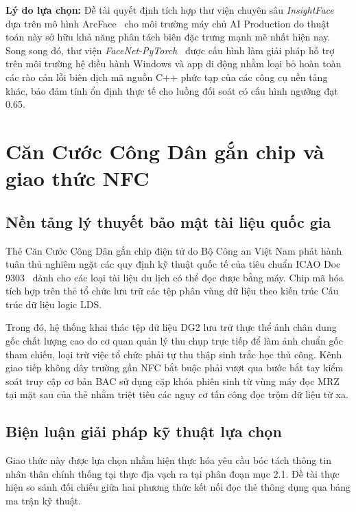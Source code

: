 ﻿\documentclass[../DoAn.tex]{subfiles}
\begin{document}
\textbf{Lý do lựa chọn:} Đề tài quyết định tích hợp thư viện chuyên sâu \textit{InsightFace}~\cite{insightface_github} dựa trên mô hình ArcFace~\cite{deng2019arcface} cho môi trường máy chủ AI Production do thuật toán này sở hữu khả năng phân tách biên đặc trưng mạnh mẽ nhất hiện nay. Song song đó, thư viện \textit{FaceNet-PyTorch}~\cite{facenet2015} được cấu hình làm giải pháp hỗ trợ trên môi trường hệ điều hành Windows và app di động nhằm loại bỏ hoàn toàn các rào cản lỗi biên dịch mã nguồn C++ phức tạp của các công cụ nền tảng khác, bảo đảm tính ổn định thực tế cho luồng đối soát có cấu hình ngưỡng đạt 0.65.

\clearpage

\section{Căn Cước Công Dân gắn chip và giao thức NFC}
\label{section:3.2}

\subsection{Nền tảng lý thuyết bảo mật tài liệu quốc gia}

Thẻ Căn Cước Công Dân gắn chip điện tử do Bộ Công an Việt Nam phát hành tuân thủ nghiêm ngặt các quy định kỹ thuật quốc tế của tiêu chuẩn ICAO Doc 9303~\cite{icao9303} dành cho các loại tài liệu du lịch có thể đọc được bằng máy. Chip mã hóa tích hợp trên thẻ tổ chức lưu trữ các tệp phân vùng dữ liệu theo kiến trúc Cấu trúc dữ liệu logic LDS. 

Trong đó, hệ thống khai thác tệp dữ liệu DG2 lưu trữ thực thể ảnh chân dung gốc chất lượng cao do cơ quan quản lý thu chụp trực tiếp để làm ảnh chuẩn gốc tham chiếu, loại trừ việc tổ chức phải tự thu thập sinh trắc học thủ công. Kênh giao tiếp không dây trường gần NFC bắt buộc phải vượt qua bước bắt tay kiểm soát truy cập cơ bản BAC sử dụng cặp khóa phiên sinh từ vùng máy đọc MRZ tại mặt sau của thẻ nhằm triệt tiêu các nguy cơ tấn công đọc trộm dữ liệu từ xa.

\subsection{Biện luận giải pháp kỹ thuật lựa chọn}

Giao thức này được lựa chọn nhằm hiện thực hóa yêu cầu bóc tách thông tin nhân thân chính thống tại thực địa vạch ra tại phân đoạn mục 2.1. Đề tài thực hiện so sánh đối chiếu giữa hai phương thức kết nối đọc thẻ thông dụng qua bảng ma trận kỹ thuật.
\end{document}
